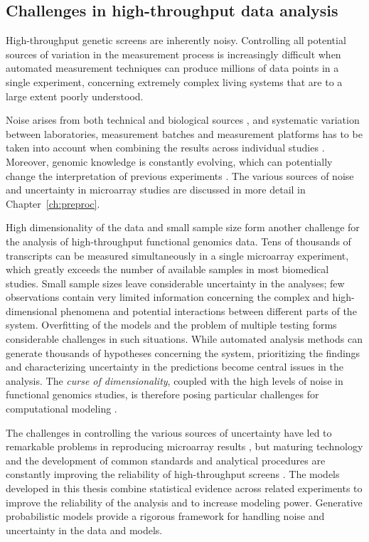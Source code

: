 \subsection{Challenges in high-throughput data analysis} 

High-throughput genetic screens are inherently noisy. Controlling all
potential sources of variation in the measurement process is
increasingly difficult when automated measurement techniques can
produce millions of data points in a single experiment, concerning
extremely complex living systems that are to a large extent poorly
understood.

Noise arises from both technical and biological sources
\citep{Butte02a}, and systematic variation between laboratories,
measurement batches and measurement platforms has to be taken into
account when combining the results across individual studies
\citep{Heber06, Shi06}. Moreover, genomic knowledge is constantly
evolving, which can potentially change the interpretation of previous
experiments \citep[see e.g.][]{Dai05}. The various sources of noise
and uncertainty in microarray studies are discussed in more detail in
Chapter~\ref{ch:preproc}.

High dimensionality of the data and small sample size form another
challenge for the analysis of high-throughput functional genomics
data. Tens of thousands of transcripts can be measured simultaneously
in a single microarray experiment, which greatly exceeds the number of
available samples in most biomedical studies. Small sample sizes leave
considerable uncertainty in the analyses; few observations contain
very limited information concerning the complex and high-dimensional
phenomena and potential interactions between different parts of the
system.  Overfitting of the models and the problem of multiple testing
forms considerable challenges in such situations.  While automated
analysis methods can generate thousands of hypotheses concerning the
system, prioritizing the findings and characterizing uncertainty in
the predictions become central issues in the analysis.  The {\it curse
  of dimensionality}, coupled with the high levels of noise in
functional genomics studies, is therefore posing particular challenges
for computational modeling \citep{Saeys2007}.

The challenges in controlling the various sources of uncertainty have
led to remarkable problems in reproducing microarray results
\citep{Ioannidis09}, but maturing technology and the development of
common standards and analytical procedures are constantly improving
the reliability of high-throughput screens \citep{Allison06,
  Reimers2010, Shi06}. The models developed in this thesis combine
statistical evidence across related experiments to improve the
reliability of the analysis and to increase modeling power.
Generative probabilistic models provide a rigorous framework for
handling noise and uncertainty in the data and models.

